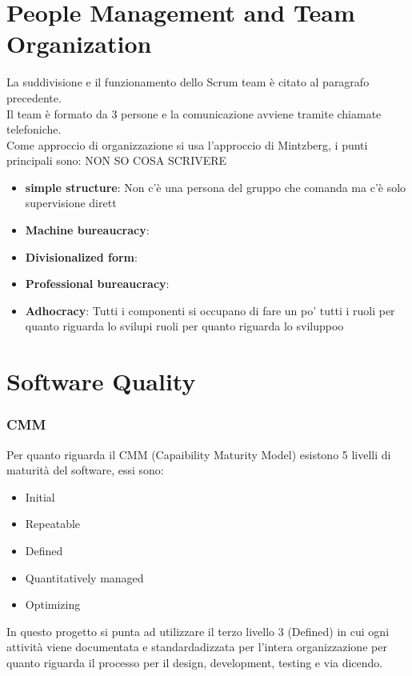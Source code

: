 \documentclass{article}
\begin{document}
\section{People Management and Team Organization}
La suddivisione e il funzionamento dello Scrum team è citato al paragrafo precedente. 
\\Il team è formato da 3 persone e la comunicazione avviene tramite chiamate telefoniche.
\\Come approccio di organizzazione si usa l'approccio di Mintzberg, i punti principali sono:
NON SO COSA SCRIVERE
\begin{itemize}
     \item \textbf{simple structure}: Non c'è una persona del gruppo che comanda ma c'è solo supervisione
        dirett
    \item \textbf{Machine bureaucracy}:
    \item \textbf{Divisionalized form}:
    \item \textbf{Professional bureaucracy}: 
    \item \textbf{Adhocracy}: Tutti i componenti si occupano di fare un po' tutti i ruoli per 
        quanto riguarda lo svilupi ruoli per 
        quanto riguarda lo sviluppoo
    
\end{itemize}
   \newpage
\section{Software Quality}
\subsubsection{CMM}
Per quanto riguarda il CMM (Capaibility Maturity Model) esistono 5 livelli di maturità del software, essi sono:
\begin{itemize}
    \item Initial 
    \item Repeatable
    \item Defined
    \item Quantitatively managed
    \item Optimizing
\end{itemize}
In questo progetto si punta ad utilizzare il terzo livello 3 (Defined) in cui ogni attività viene documentata
e standardadizzata per l'intera organizzazione per quanto riguarda il  processo per il design, development, testing e via dicendo.
\end{document}
